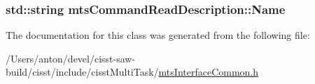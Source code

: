 \subsubsection[{Name}]{\setlength{\rightskip}{0pt plus 5cm}std\+::string mts\+Command\+Read\+Description\+::\+Name}\label{classmts_command_read_description_a6a4939db07848192ec849d2c192c3aba}


The documentation for this class was generated from the following file\+:\begin{DoxyCompactItemize}
\item 
/\+Users/anton/devel/cisst-\/saw-\/build/cisst/include/cisst\+Multi\+Task/\hyperlink{mts_interface_common_8h}{mts\+Interface\+Common.\+h}\end{DoxyCompactItemize}
